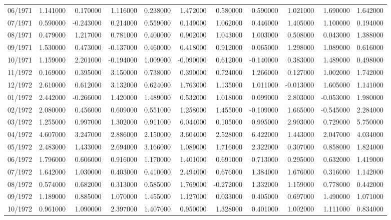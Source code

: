 \begin{tabular}{lrrrrrrrrrr}
06/1971 & 1.141000 & 0.170000 & 1.116000 & 0.238000 & 1.472000 & 0.580000 & 0.590000 & 1.021000 & 1.690000 & 1.642000 \\
07/1971 & 0.590000 & -0.243000 & 0.214000 & 0.559000 & 0.149000 & 1.062000 & 0.446000 & 1.405000 & 1.100000 & 0.194000 \\
08/1971 & 0.479000 & 1.217000 & 0.781000 & 0.400000 & 0.902000 & 1.043000 & 1.003000 & 0.508000 & 0.043000 & 1.388000 \\
09/1971 & 1.530000 & 0.473000 & -0.137000 & 0.460000 & 0.418000 & 0.912000 & 0.065000 & 1.298000 & 1.089000 & 0.616000 \\
10/1971 & 1.159000 & 2.201000 & -0.194000 & 1.009000 & -0.090000 & 0.612000 & -0.140000 & 0.383000 & 1.489000 & 0.498000 \\
11/1972 & 0.169000 & 0.395000 & 3.150000 & 0.738000 & 0.390000 & 0.724000 & 1.266000 & 0.127000 & 1.002000 & 1.742000 \\
12/1972 & 2.610000 & 0.612000 & 3.132000 & 0.624000 & 1.763000 & 1.135000 & 1.011000 & -0.013000 & 1.605000 & 1.141000 \\
01/1972 & 2.442000 & -0.266000 & 1.420000 & 1.489000 & 0.532000 & 1.018000 & 0.099000 & 2.803000 & -0.053000 & 1.980000 \\
02/1972 & 2.080000 & 0.456000 & 0.609000 & 0.551000 & 1.258000 & 1.455000 & -0.109000 & 1.665000 & -0.545000 & 2.284000 \\
03/1972 & 1.255000 & 0.997000 & 1.302000 & 0.911000 & 6.044000 & 0.105000 & 0.995000 & 2.993000 & 0.729000 & 5.750000 \\
04/1972 & 4.607000 & 3.247000 & 2.886000 & 2.150000 & 3.604000 & 2.528000 & 6.422000 & 1.443000 & 2.047000 & 4.034000 \\
05/1972 & 2.483000 & 1.433000 & 2.694000 & 3.166000 & 1.089000 & 1.716000 & 2.322000 & 0.307000 & 0.858000 & 1.824000 \\
06/1972 & 1.796000 & 0.606000 & 0.916000 & 1.170000 & 1.401000 & 0.691000 & 0.713000 & 0.295000 & 0.632000 & 1.419000 \\
07/1972 & 1.642000 & 1.030000 & 0.403000 & 0.410000 & 2.494000 & 0.676000 & 1.384000 & 1.676000 & 0.316000 & 1.142000 \\
08/1972 & 0.574000 & 0.682000 & 0.313000 & 0.585000 & 1.769000 & -0.272000 & 1.332000 & 1.159000 & 0.778000 & 0.442000 \\
09/1972 & 1.189000 & 0.885000 & 1.070000 & 1.455000 & 1.127000 & 0.033000 & 0.405000 & 0.697000 & 1.490000 & 1.071000 \\
10/1972 & 0.961000 & 1.090000 & 2.397000 & 1.407000 & 0.950000 & 1.328000 & 0.401000 & 1.002000 & 1.111000 & 0.834000 \\

\end{tabular}
